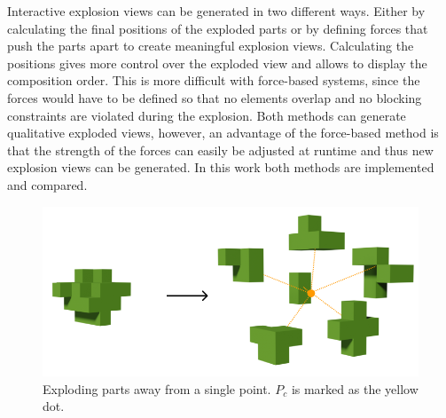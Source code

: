 Interactive explosion views can be generated in two different ways. 
Either by calculating the final positions of the exploded parts or by defining forces that push the parts apart to create meaningful explosion views.
Calculating the positions gives more control over the exploded view and allows to display the composition order. 
This is more difficult with force-based systems, since the forces would have to be defined so that no elements overlap and no blocking constraints are violated during the explosion. 
Both methods can generate qualitative exploded views, however, an advantage of the force-based method is that the strength of the forces can easily be adjusted at runtime and thus new explosion views can be generated. 
In this work both methods are implemented and compared.



\begin{figure}[h]
	\centering
	\includegraphics[width=.65\linewidth]{fig/Images/PointExplosion}
	\caption[]{Exploding parts away from a single point. $P_c$ is marked as the yellow dot.}
	\label{fig:pointExpl1}
\end{figure}

